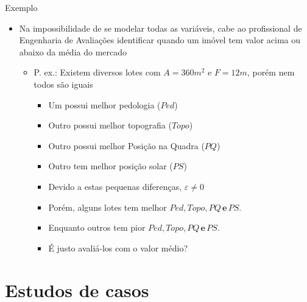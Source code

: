 \documentclass[9pt,ignorenonframetext,aspectratio=169]{beamer}
\providecommand{\tightlist}{%
  \setlength{\itemsep}{0pt}\setlength{\parskip}{0pt}}
\begin{document}
\begin{frame}{Exemplo}
\protect\hypertarget{exemplo}{}

\begin{itemize}[<+->]
\tightlist
\item
  Na impossibilidade de se modelar todas as variáveis, cabe ao
  profissional de Engenharia de Avaliações identificar quando um imóvel
  tem valor acima ou abaixo da média do mercado

  \begin{itemize}[<+->]
  \tightlist
  \item
    P. ex.: Existem diversos lotes com \(A = 360m^2\) e \(F = 12m\),
    porém nem todos são iguais

    \begin{itemize}[<+->]
    \tightlist
    \item
      Um possui melhor pedologia (\(Ped\))
    \item
      Outro possui melhor topografia (\(Topo\))
    \item
      Outro possui melhor Posição na Quadra (\(PQ\))
    \item
      Outro tem melhor posição solar (\(PS\))
    \item
      Devido a estas pequenas diferenças, \(\varepsilon \ne 0\)
    \item
      Porém, alguns lotes tem melhor
      \(Ped, Topo, PQ \,\textbf{e}\, PS\).
    \item
      Enquanto outros tem pior \(Ped, Topo, PQ \,\textbf{e}\, PS\).
    \item
      É justo avaliá-los com o valor médio?
    \end{itemize}
  \end{itemize}
\end{itemize}

\end{frame}

\hypertarget{estudos-de-casos}{%
\section{Estudos de casos}\label{estudos-de-casos}}
\end{document}

